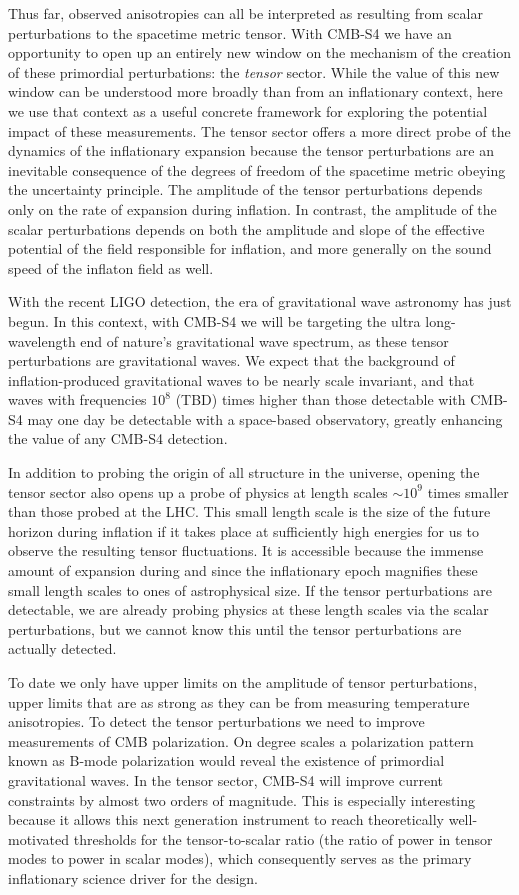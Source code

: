 Thus far, observed anisotropies can all be interpreted as resulting from scalar perturbations to the spacetime metric tensor.  With CMB-S4 we have an opportunity to open up an entirely new window on the mechanism of the creation of these primordial perturbations: the {\em tensor} sector. While the value of this new window can be understood more broadly than from an inflationary context, here we use that context as a useful concrete framework for exploring the potential impact of these measurements. The tensor sector offers a more direct probe of the dynamics of the inflationary expansion because the tensor perturbations are an inevitable consequence of the degrees of freedom of the spacetime metric obeying the uncertainty principle. The amplitude of the tensor perturbations depends only on the rate of expansion during inflation. In contrast, the amplitude of the scalar perturbations depends on both the amplitude and slope of the effective potential of the field responsible for inflation, and more generally on the sound speed of the inflaton field as well.

With the recent LIGO detection, the era of gravitational wave astronomy has just begun. In this context, with CMB-S4 we will be targeting the ultra long-wavelength end of nature's gravitational wave spectrum, as these tensor perturbations are gravitational waves. We expect that the background of inflation-produced gravitational waves to be nearly scale invariant, and that waves with frequencies $10^8$ (TBD) times higher than those detectable with CMB-S4 may one day be detectable with a space-based observatory, greatly enhancing the value of any CMB-S4 detection. 

In addition to probing the origin of all structure in the universe, opening the tensor sector also opens up a probe of physics at length scales $\sim 10^9$ times smaller than those probed at the LHC. This small length scale is the size of the future horizon during inflation if it takes place at sufficiently high energies for us to observe the resulting tensor fluctuations. It is accessible because the immense amount of expansion during and since the inflationary epoch magnifies
these small length scales to ones of astrophysical size. If the tensor perturbations are detectable, we are already probing physics at these length scales via the scalar perturbations, but we cannot know this until the tensor perturbations are actually detected.

To date we only have upper limits on the amplitude of tensor perturbations, upper limits that are as strong as they can be from measuring temperature anisotropies. To detect the tensor perturbations we need to improve measurements of CMB polarization. On degree scales a polarization pattern known as B-mode polarization would reveal the existence of primordial gravitational waves. In the tensor sector, CMB-S4 will improve current constraints by almost two orders of magnitude. This is especially interesting because it allows this next generation instrument to reach theoretically well-motivated thresholds for the tensor-to-scalar ratio (the ratio of power in tensor modes to power in scalar modes), which consequently serves as the primary inflationary science driver for the design. 


